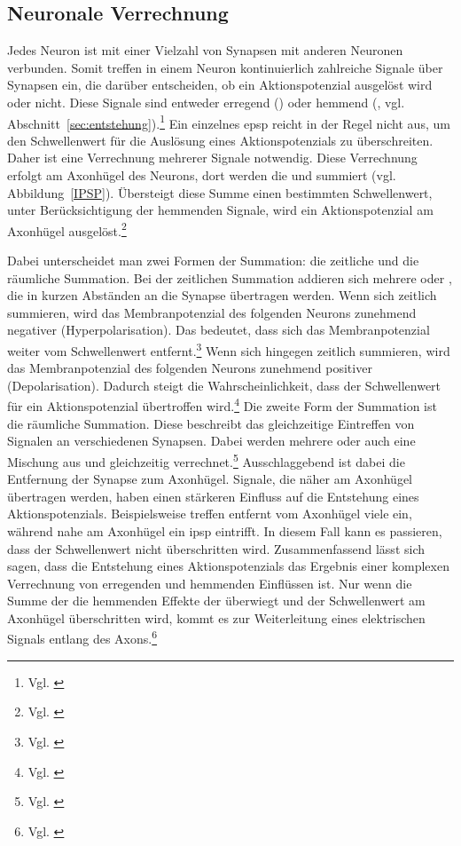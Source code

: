 \subsection{Neuronale Verrechnung}

Jedes Neuron ist mit einer Vielzahl von Synapsen mit anderen Neuronen verbunden. Somit treffen in einem Neuron kontinuierlich zahlreiche Signale über Synapsen ein, die darüber entscheiden, ob ein Aktionspotenzial ausgelöst wird oder nicht. Diese Signale sind entweder erregend () oder hemmend (, vgl. Abschnitt~\ref{sec:entstehung}).\footnote{Vgl. \cite{betts2022_openstax}} Ein einzelnes \acrshort{epsp} reicht in der Regel nicht aus, um den Schwellenwert für die Auslösung eines Aktionspotenzials zu überschreiten. Daher ist eine Verrechnung mehrerer Signale notwendig. Diese Verrechnung erfolgt am Axonhügel des Neurons, dort werden die  und  summiert (vgl. Abbildung~\ref{IPSP}). Übersteigt diese Summe einen bestimmten Schwellenwert, unter Berücksichtigung der hemmenden Signale, wird ein Aktionspotenzial am Axonhügel ausgelöst.\footnote{Vgl. \cite{betts2022_openstax}}

Dabei unterscheidet man zwei Formen der Summation: die zeitliche und die räumliche Summation. Bei der zeitlichen Summation addieren sich mehrere  oder , die in kurzen Abständen an die Synapse übertragen werden. Wenn sich  zeitlich summieren, wird das Membranpotenzial des folgenden Neurons zunehmend negativer (Hyperpolarisation). Das bedeutet, dass sich das Membranpotenzial weiter vom Schwellenwert entfernt.\footnote{Vgl. \cite{examio_summation}} Wenn sich hingegen  zeitlich summieren, wird das Membranpotenzial des folgenden Neurons zunehmend positiver (Depolarisation). Dadurch steigt die Wahrscheinlichkeit, dass der Schwellenwert für ein Aktionspotenzial übertroffen wird.\footnote{Vgl. \cite{examio_summation}} Die zweite Form der Summation ist die räumliche Summation. Diese beschreibt das gleichzeitige Eintreffen von Signalen an verschiedenen Synapsen. Dabei werden mehrere  oder auch eine Mischung aus  und  gleichzeitig verrechnet.\footnote{Vgl. \cite{examio_summation}} Ausschlaggebend ist dabei die Entfernung der Synapse zum Axonhügel. Signale, die näher am Axonhügel übertragen werden, haben einen stärkeren Einfluss auf die Entstehung eines Aktionspotenzials. Beispielsweise treffen entfernt vom Axonhügel viele  ein, während nahe am Axonhügel ein \acrshort{ipsp} eintrifft. In diesem Fall kann es passieren, dass der Schwellenwert nicht überschritten wird. Zusammenfassend lässt sich sagen, dass die Entstehung eines Aktionspotenzials das Ergebnis einer komplexen Verrechnung von erregenden und hemmenden Einflüssen ist. Nur wenn die Summe der  die hemmenden Effekte der  überwiegt und der Schwellenwert am Axonhügel überschritten wird, kommt es zur Weiterleitung eines elektrischen Signals entlang des Axons.\footnote{Vgl. \cite{betts2022_openstax}}

